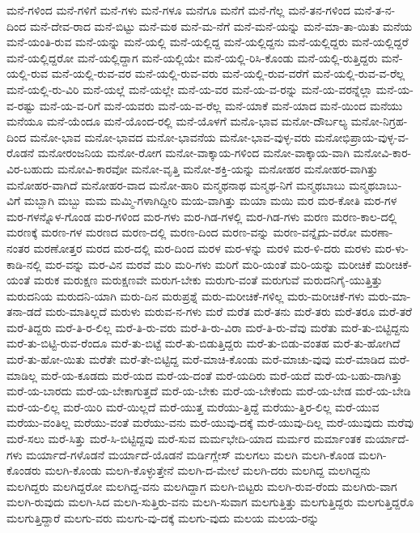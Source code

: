 {ಮನೆ-ಗಳಿಂದ
ಮನೆ-ಗಳಿಗೆ
ಮನೆ-ಗಳು
ಮನೆ-ಗಳೂ
ಮನೆಗೂ
ಮನೆಗೆ
ಮನೆ-ಗೆಲ್ಲ
ಮನೆ-ತನ-ಗಳಿಂದ
ಮನೆ-ತ-ನ-ದಿಂದ
ಮನೆ-ದೇವ-ರಾದ
ಮನೆ-ಬಿಟ್ಟು
ಮನೆ-ಮಠ
ಮನೆ-ಮ-ನೆಗೆ
ಮನೆ-ಮನೆ-ಯನ್ನು
ಮನೆ-ಮಾ-ತಾ-ಯಿತು
ಮನೆಯ
ಮನೆ-ಯಂತಿ-ರುವ
ಮನೆ-ಯನ್ನು
ಮನೆ-ಯಲ್ಲಿ
ಮನೆ-ಯಲ್ಲಿದ್ದ
ಮನೆ-ಯಲ್ಲಿದ್ದನು
ಮನೆ-ಯಲ್ಲಿದ್ದರು
ಮನೆ-ಯಲ್ಲಿದ್ದರೆ
ಮನೆ-ಯಲ್ಲಿದ್ದರೋ
ಮನೆ-ಯಲ್ಲಿದ್ದಾಗ
ಮನೆ-ಯಲ್ಲಿಯೇ
ಮನೆ-ಯಲ್ಲಿ-ರಿಸಿ-ಕೊಂಡು
ಮನೆ-ಯಲ್ಲಿ-ರುತ್ತಿದ್ದರು
ಮನೆ-ಯಲ್ಲಿ-ರುವ
ಮನೆ-ಯಲ್ಲಿ-ರುವ-ವರ
ಮನೆ-ಯಲ್ಲಿ-ರುವ-ವರು
ಮನೆ-ಯಲ್ಲಿ-ರುವ-ವರೆಗೆ
ಮನೆ-ಯಲ್ಲಿ-ರುವ-ವ-ರೆಲ್ಲ
ಮನೆ-ಯಲ್ಲಿ-ರು-ವಿರಿ
ಮನೆ-ಯಲ್ಲೆ
ಮನೆ-ಯಲ್ಲೇ
ಮನೆ-ಯ-ವರ
ಮನೆ-ಯ-ವ-ರನ್ನು
ಮನೆ-ಯ-ವರನ್ನೆಲ್ಲಾ
ಮನೆ-ಯ-ವ-ರಷ್ಟು
ಮನೆ-ಯ-ವ-ರಿಗೆ
ಮನೆ-ಯವರು
ಮನೆ-ಯ-ವ-ರೆಲ್ಲ
ಮನೆ-ಯಾಕೆ
ಮನೆ-ಯಾದ
ಮನೆ-ಯಿಂದ
ಮನೆಯು
ಮನೆಯೂ
ಮನೆ-ಯೆಂದೂ
ಮನೆ-ಯೊಂದ-ರಲ್ಲಿ
ಮನೆ-ಯೊಳಗೆ
ಮನೊ-ಭಾವ
ಮನೋ-ದೌರ್ಬಲ್ಯ
ಮನೋ-ನಿಗ್ರಹ-ದಿಂದ
ಮನೋ-ಭಾವ
ಮನೋ-ಭಾವದ
ಮನೋ-ಭಾವನೆಯ
ಮನೋ-ಭಾವ-ವುಳ್ಳ-ವರು
ಮನೋಭಿಪ್ರಾಯ-ವುಳ್ಳ-ವ-ರೊಡನೆ
ಮನೋರಂಜನಿಯ
ಮನೋ-ರೋಗ
ಮನೋ-ವಾಕ್ಕಾಯ-ಗಳಿಂದ
ಮನೋ-ವಾಕ್ಕಾಯ-ವಾಗಿ
ಮನೋವಿ-ಕಾರ-ವಿರ-ಬಹುದು
ಮನೋವಿ-ಕಾರವೋ
ಮನೋ-ವೃತ್ತಿ
ಮನೋ-ಶಕ್ತಿ-ಯನ್ನು
ಮನೋಹರ
ಮನೋಹರ-ವಾಗಿತ್ತು
ಮನೋಹರ-ವಾಗಿದೆ
ಮನೋಹರ-ವಾದ
ಮನೋ-ಹಾರಿ
ಮನ್ಮಥನಾಥ
ಮನ್ಮಥ-ನಿಗೆ
ಮನ್ಮಥಬಾಬು
ಮನ್ಮಥಬಾಬು-ವಿಗೆ
ಮಬ್ಬಾಗಿ
ಮಬ್ಬು
ಮಮ
ಮಮ್ಮಿ-ಗಳಾಗಿದ್ದೀರಿ
ಮಯ-ವಾಗಿತ್ತು
ಮಯಾ
ಮಯಿ
ಮರ
ಮರ-ಕೋತಿ
ಮರ-ಗಳ
ಮರ-ಗಳನ್ನೊಳ-ಗೊಂಡ
ಮರ-ಗಳಿಂದ
ಮರ-ಗಳು
ಮರ-ಗಿಡ-ಗಳಲ್ಲಿ
ಮರ-ಗಿಡ-ಗಳು
ಮರಣ
ಮರಣ-ಕಾಲ-ದಲ್ಲಿ
ಮರಣಕ್ಕೆ
ಮರಣ-ಗಳ
ಮರಣದ
ಮರಣ-ದಲ್ಲಿ
ಮರಣ-ದಿಂದ
ಮರಣ-ವನ್ನು
ಮರಣ-ವನ್ನೈದು-ವರೋ
ಮರಣಾ-ನಂತರ
ಮರಣೋತ್ತರ
ಮರದ
ಮರ-ದಲ್ಲಿ
ಮರ-ದಿಂದ
ಮರಳ
ಮರ-ಳನ್ನು
ಮರಳಿ
ಮರ-ಳಿ-ದರು
ಮರಳು
ಮರ-ಳು-ಕಾಡಿ-ನಲ್ಲಿ
ಮರ-ವನ್ನು
ಮರ-ವಿನ
ಮರವೆ
ಮರಿ
ಮರಿ-ಗಳು
ಮರಿಗೆ
ಮರಿ-ಯಂತೆ
ಮರಿ-ಯನ್ನು
ಮರೀಚಿಕೆ
ಮರೀಚಿಕೆ-ಯಂತೆ
ಮರುಕ
ಮರುಕ್ಷಣ
ಮರುಕ್ಷಣವೇ
ಮರುಗ-ಬೇಕು
ಮರುಗು-ವಂತೆ
ಮರುಗುವೆ
ಮರುದನಿಗೈ-ಯುತ್ತಿತ್ತು
ಮರುದನಿಯ
ಮರುದನಿ-ಯಾಗಿ
ಮರು-ದಿನ
ಮರುಪ್ರಶ್ನೆ
ಮರು-ಮರೀಚಿಕೆ-ಗಳಿಲ್ಲ
ಮರು-ಮರೀಚಿಕೆ-ಗಳು
ಮರು-ಮಾ-ತನಾ-ಡದೆ
ಮರು-ಮಾತಿಲ್ಲದೆ
ಮರುಳು
ಮರುವ-ನ-ಗಳು
ಮರೆ
ಮರೆತ
ಮರೆ-ತನು
ಮರೆ-ತರು
ಮರೆ-ತರೂ
ಮರೆ-ತರೆ
ಮರೆ-ತಿದ್ದರು
ಮರೆ-ತಿ-ರ-ಲಿಲ್ಲ
ಮರೆ-ತಿ-ರು-ವರು
ಮರೆ-ತಿ-ರು-ವಿರಾ
ಮರೆ-ತಿ-ರು-ವೆವು
ಮರೆತು
ಮರೆ-ತು-ಬಿಟ್ಟಿದ್ದನು
ಮರೆ-ತು-ಬಿಟ್ಟಿ-ರುವ-ರೆಂದೂ
ಮರೆ-ತು-ಬಿಟ್ಟೆ
ಮರೆ-ತು-ಬಿಡುತ್ತಿದ್ದರು
ಮರೆ-ತು-ಬಿಡು-ವಂತಹ
ಮರೆ-ತು-ಹೋಗಿದೆ
ಮರೆ-ತು-ಹೋ-ಯಿತು
ಮರೆತೇ
ಮರೆ-ತೇ-ಬಿಟ್ಟಿದ್ದ
ಮರೆ-ಮಾಚಿ-ಕೊಂಡು
ಮರೆ-ಮಾಚು-ವುವು
ಮರೆ-ಮಾಡಿದ
ಮರೆ-ಮಾಡಿಲ್ಲ
ಮರೆ-ಯ-ಕೂಡದು
ಮರೆ-ಯದ
ಮರೆ-ಯ-ದಂತೆ
ಮರೆ-ಯದಿರು
ಮರೆ-ಯದೆ
ಮರೆ-ಯ-ಬಹು-ದಾಗಿತ್ತು
ಮರೆ-ಯ-ಬಾರದು
ಮರೆ-ಯ-ಬೇಕಾಗುತ್ತದೆ
ಮರೆ-ಯ-ಬೇಕು
ಮರೆ-ಯ-ಬೇಕೆಂದು
ಮರೆ-ಯ-ಬೇಡ
ಮರೆ-ಯ-ಬೇಡಿ
ಮರೆ-ಯ-ಲಿಲ್ಲ
ಮರೆ-ಯಿರಿ
ಮರೆ-ಯಿಲ್ಲದೆ
ಮರೆ-ಯುತ್ತ
ಮರೆಯು-ತ್ತಿದ್ದೆ
ಮರೆಯು-ತ್ತಿರ-ಲಿಲ್ಲ
ಮರೆ-ಯುವ
ಮರೆಯು-ವಂತಿಲ್ಲ
ಮರೆಯು-ವಂತೆ
ಮರೆಯು-ವನು
ಮರೆ-ಯುವು-ದಕ್ಕೆ
ಮರೆ-ಯುವು-ದಿಲ್ಲ
ಮರೆ-ಯುವುದು
ಮರೆವು
ಮರೆ-ಸಲು
ಮರೆ-ಸಿತ್ತು
ಮರೆ-ಸಿ-ಬಿಟ್ಟಿದ್ದವು
ಮರೆ-ಸುವ
ಮರ್ಮಭೇದಿ-ಯಾದ
ಮರ್ಮರ
ಮರ್ಮಾಂತಕ
ಮರ್ಯಾದೆ-ಗಳು
ಮರ್ಯಾದೆ-ಗಳೊಡನೆ
ಮರ್ಯಾದೆ-ಯೊಡನೆ
ಮರ್ಡಿಗ್ಲೇಸ್
ಮಲಗಲು
ಮಲಗಿ
ಮಲಗಿ-ಕೊಂಡ
ಮಲಗಿ-ಕೊಂಡರು
ಮಲಗಿ-ಕೊಂಡು
ಮಲಗಿ-ಕೊಳ್ಳುತ್ತೇನೆ
ಮಲಗಿ-ದ-ಮೇಲೆ
ಮಲಗಿ-ದರು
ಮಲಗಿದ್ದ
ಮಲಗಿದ್ದನು
ಮಲಗಿದ್ದರು
ಮಲಗಿದ್ದರೋ
ಮಲಗಿದ್ದ-ವನು
ಮಲಗಿದ್ದಾಗ
ಮಲಗಿ-ಬಿಟ್ಟರು
ಮಲಗಿ-ರುವ-ರೆಂದು
ಮಲಗಿರು-ವಾಗ
ಮಲಗಿ-ರುವುದು
ಮಲಗಿ-ಸಿದ
ಮಲಗಿ-ಸುತ್ತಿರು-ವನು
ಮಲಗಿ-ಸುವಾಗ
ಮಲಗುತ್ತಿತ್ತು
ಮಲಗುತ್ತಿದ್ದರು
ಮಲಗುತ್ತಿದ್ದರೊ
ಮಲಗುತ್ತಿದ್ದಾರೆ
ಮಲಗು-ವರು
ಮಲಗು-ವು-ದಕ್ಕೆ
ಮಲಗು-ವುದು
ಮಲಯ
ಮಲಯ-ರನ್ನು
}
